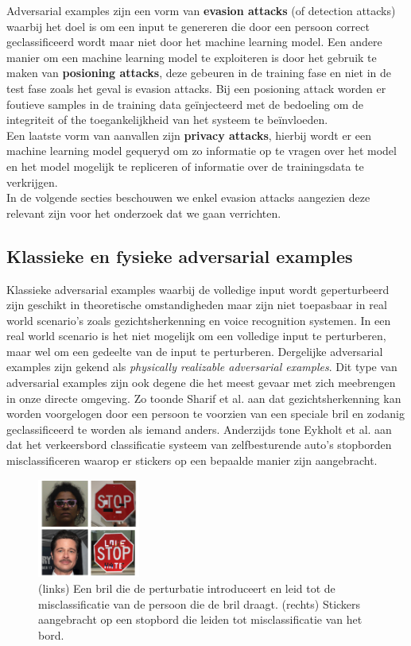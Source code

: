 \documentclass{article}
\begin{document}
\begin{multicols*}{2}
Adversarial examples zijn een vorm van \textbf{evasion attacks} (of detection attacks) \cite{Biggio_2013} waarbij het doel is om een input te genereren die door een persoon correct geclassificeerd wordt maar niet door het machine learning model. Een andere manier om een machine learning model te exploiteren is door het gebruik te maken van \textbf{posioning attacks}, deze gebeuren in de training fase en niet in de test fase zoals het geval is evasion attacks. Bij een posioning attack worden er foutieve samples in de training data geïnjecteerd met de bedoeling om de integriteit of the toegankelijkheid van het systeem te beïnvloeden. \\
Een laatste vorm van aanvallen zijn \textbf{privacy attacks}, hierbij wordt er een machine learning model gequeryd om zo informatie op te vragen over het model en het model mogelijk te repliceren of informatie over de trainingsdata te verkrijgen. \\
In de volgende secties beschouwen we enkel evasion attacks aangezien deze relevant zijn voor het onderzoek dat we gaan verrichten.

\subsection{Klassieke en fysieke adversarial examples}
Klassieke adversarial examples waarbij de volledige input wordt geperturbeerd zijn geschikt in theoretische omstandigheden maar zijn niet toepasbaar in real world scenario's zoals gezichtsherkenning en voice recognition systemen. In een real world scenario is het niet mogelijk om een volledige input te perturberen, maar wel om een gedeelte van de input te perturberen. Dergelijke adversarial examples zijn gekend als \textit{physically realizable adversarial examples}. Dit type van adversarial examples zijn ook degene die het meest gevaar met zich meebrengen in onze directe omgeving. Zo toonde Sharif et al. \cite{Sharif16AdvML} aan dat gezichtsherkenning kan worden voorgelogen door een persoon te voorzien van een speciale bril en zodanig geclassificeerd te worden als iemand anders. Anderzijds tone Eykholt et al. \cite{eykholt2018robust} aan dat het verkeersbord classificatie systeem van zelfbesturende auto's stopborden misclassificeren waarop er stickers op een bepaalde manier zijn aangebracht.

\begin{figure}[H]
    \centering
    \includegraphics[width=0.3\textwidth]{threat_real.png}
    \caption{(links) Een bril die de perturbatie introduceert en leid tot de misclassificatie van de persoon die de bril draagt. (rechts) Stickers aangebracht op een stopbord die leiden tot misclassificatie van het bord.}
    \label{fig:realthreat}
\end{figure}


\end{multicols*}
\end{document}
